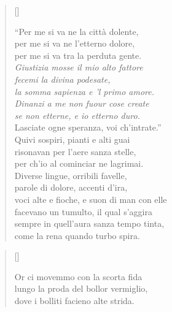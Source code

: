 \documentclass{article}
\begin{document}
\begin{verse}[\versewidth]
  \begin{patverse*}
    ``Per me si va ne la città dolente,\\
    per me si va ne l'etterno dolore,\\
    per me si va tra la perduta gente.\\
    \emph{Giustizia mosse il mio alto fattore\\
    fecemi la divina podesate,\\
    la somma sapienza e 'l primo amore.\\
    Dinanzi a me non fuour cose create\\
    se non etterne, e io etterno duro.}\\
    Lasciate ogne speranza, voi ch'intrate.''\\
    Quivi sospiri, pianti e alti guai\\
    risonavan per l'aere sanza stelle,\\
    per ch'io al cominciar ne lagrimai.\\
    Diverse lingue, orribili favelle,\\
    parole di dolore, accenti d'ira,\\
    voci alte e fioche, e suon di man con elle\\
    facevano un tumulto, il qual s'aggira\\
    sempre in quell'aura sanza tempo tinta,\\
    come la rena quando turbo spira.
  \end{patverse*}
\end{verse}

\begin{verse}[\versewidth]
  \begin{patverse*}
    Or ci movemmo con la scorta fida\\
    lungo la proda del bollor vermiglio,\\
    dove i bolliti facieno alte strida.
  \end{patverse*}
\end{verse}
\end{document}
